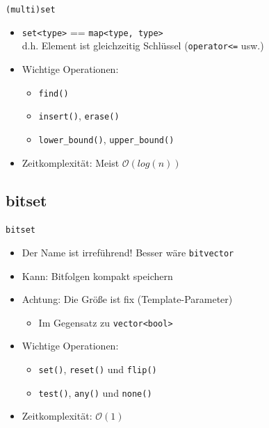 \begin{frame}{\texttt{(multi)set}}
	\begin{itemize}
		\item \texttt{set<type>} == \texttt{map<type, type>}	\\
		      d.h. Element ist gleichzeitig Schlüssel (\texttt{operator<=} usw.)
		\pause
		\item Wichtige Operationen:
		\begin{itemize}
			\item \texttt{find()}
			\item \texttt{insert()}, \texttt{erase()}
			\item \texttt{lower\_bound()}, \texttt{upper\_bound()}
		\end{itemize}
		\pause
		\item Zeitkomplexität: Meist $\mathcal{O}(log(n))$
	\end{itemize}
\end{frame}

\subsection{bitset}

\begin{frame}{\texttt{bitset}}
	\begin{itemize}
		\item Der Name ist irreführend! Besser wäre \texttt{bitvector}
		\item Kann: Bitfolgen kompakt speichern
		\item Achtung: Die Größe ist fix (Template-Parameter)
		\begin{itemize}
			\item Im Gegensatz zu \texttt{vector<bool>}
		\end{itemize}
		\pause
		\item Wichtige Operationen:
		\begin{itemize}
			\item \texttt{set()}, \texttt{reset()} und \texttt{flip()}
			\item \texttt{test()}, \texttt{any()} und \texttt{none()}
		\end{itemize}
		\item Zeitkomplexität: $\mathcal{O}(1)$
	\end{itemize}
\end{frame}

